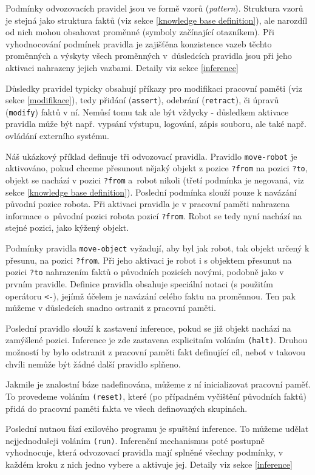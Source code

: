 Podmínky odvozovacích pravidel jsou ve formě vzorů (\emph{pattern}). Struktura
vzorů je stejná jako struktura faktů (viz sekce \ref{knowledge base
definition}), ale narozdíl od nich mohou obsahovat proměnné (symboly začínající
otazníkem).  Při vyhodnocování podmínek pravidla je zajišťěna
konzistence vazeb těchto proměnných a výskyty všech proměnných v~důsledcích
pravidla jsou při jeho aktivaci nahrazeny jejich vazbami. Detaily viz sekce
\ref{inference}

Důsledky pravidel typicky obsahují příkazy pro modifikaci pracovní paměti (viz
sekce \ref{modifikace}), tedy přidání (\verb|assert|), odebrání (\verb|retract|),
či úpravů (\verb|modify|) faktů v ní. Nemůsí
tomu tak ale být vždycky - důsledkem aktivace pravidla může být např. vypsání
výstupu, logování, zápis souboru, ale také např. ovládání externího systému.

Náš ukázkový příklad definuje tři odvozovací pravidla. Pravidlo
\verb|move-robot| je aktivováno, pokud chceme přesunout nějaký objekt z pozice
\verb|?from| na pozici \verb|?to|, objekt se nachází v pozici \verb|?from|
a~robot nikoli (třetí podmínka je negovaná, viz sekce \ref{knowledge base
definition}). Poslední podmínka slouží pouze k navázání původní pozice robota.
Při aktivaci pravidla je v pracovní paměti nahrazena informace o~původní pozici
robota pozicí \verb|?from|. Robot se tedy nyní nachází na stejné pozici, jako
kýžený objekt.

Podmínky pravidla \verb|move-object| vyžadují, aby byl jak robot, tak objekt
určený k přesunu, na pozici \verb|?from|. Při jeho aktivaci je robot i s objektem
přesunut na pozici \verb|?to| nahrazením faktů o původních pozicích novými,
podobně jako v prvním pravidle. Definice pravidla obsahuje speciální notaci (s
použitím operátoru \verb|<-|), jejímž účelem je navázání celého faktu na
proměnnou. Ten pak můžeme v důsledcích snadno ostranit z pracovní paměti.

Poslední pravidlo slouží k zastavení inference, pokud se již objekt nachází na
zamýšlené pozici. Inference je zde zastavena explicitním voláním \verb|(halt)|.
Druhou možností by bylo odstranit z pracovní paměti fakt definující cíl, neboť v
takovou chvíli nemůže být žádné další pravidlo splňeno.

Jakmile je znalostní báze nadefinována, můžeme z ní inicializovat pracovní
paměť. To provedeme voláním \verb|(reset)|, které (po případném vyčištění
původních faktů) přidá do pracovní paměti fakta ve všech definovaných skupinách.

Poslední nutnou fází exilového programu je spuštění inference. To můžeme udělat
nejjednodušeji voláním \verb|(run)|. Inferenční mechanismus poté postupně
vyhodnocuje, která odvozovací pravidla mají splněné všechny podmínky, v každém
kroku z nich jedno vybere a aktivuje jej. Detaily viz sekce \ref{inference}

